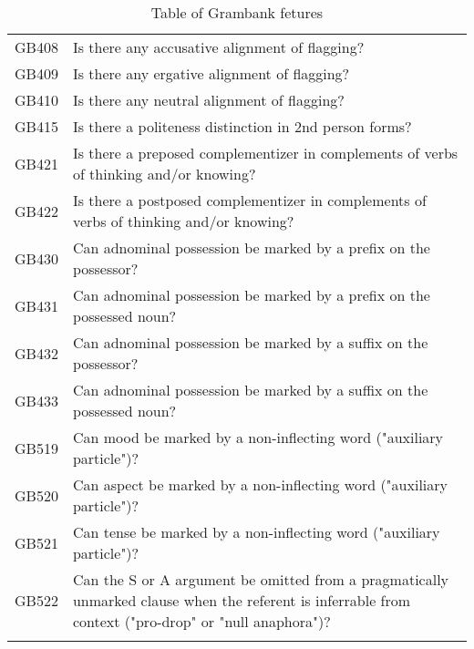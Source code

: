 \begin{longtable}{p{3cm}p{12cm}}
  GB408 & Is there any accusative alignment of flagging? \\ 
  GB409 & Is there any ergative alignment of flagging? \\ 
  GB410 & Is there any neutral alignment of flagging? \\ 
  GB415 & Is there a politeness distinction in 2nd person forms? \\ 
  GB421 & Is there a preposed complementizer in complements of verbs of thinking and/or knowing? \\ 
  GB422 & Is there a postposed complementizer in complements of verbs of thinking and/or knowing? \\ 
  GB430 & Can adnominal possession be marked by a prefix on the possessor? \\ 
  GB431 & Can adnominal possession be marked by a prefix on the possessed noun? \\ 
  GB432 & Can adnominal possession be marked by a suffix on the possessor? \\ 
  GB433 & Can adnominal possession be marked by a suffix on the possessed noun? \\ 
  GB519 & Can mood be marked by a non-inflecting word ("auxiliary particle")? \\ 
  GB520 & Can aspect be marked by a non-inflecting word ("auxiliary particle")? \\ 
  GB521 & Can tense be marked by a non-inflecting word ("auxiliary particle")? \\ 
  GB522 & Can the S or A argument be omitted from a pragmatically unmarked clause when the referent is inferrable from context ("pro-drop" or "null anaphora")? \\ 
   \bottomrule
\caption{Table of Grambank fetures} 
\label{GB_features_table}
\end{longtable}
